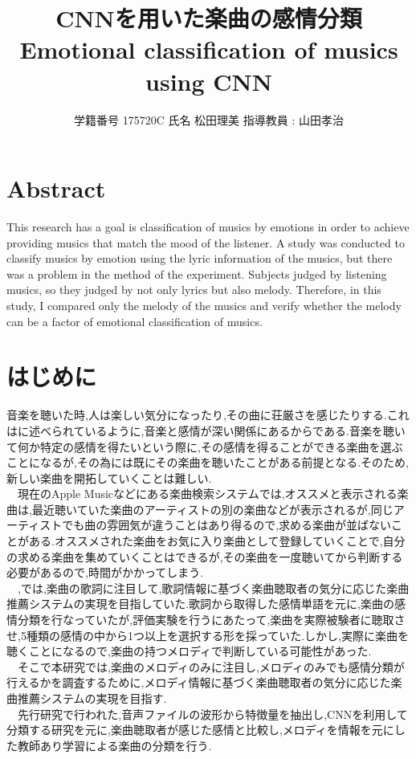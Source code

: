\documentclass[twocolumn,twoside,9.5pt]{jarticle}
\begin{document}
\title{CNNを用いた楽曲の感情分類\\Emotional classification of musics using CNN}
\author{学籍番号 {175720C} 氏名 {松田理美} 指導教員 : 山田孝治}
\date{}
\maketitle
\thispagestyle{fancy} 

\section*{Abstract}
This research has a goal is classification of musics by emotions in order to achieve providing musics that match the mood of the listener. A study was conducted to classify musics by emotion using the lyric information of the musics, but there was a problem in the method of the experiment.\cite{gushiken1}\cite{gushiken2} Subjects judged by listening musics, so they judged by not only lyrics but also melody. Therefore, in this study, I compared only the melody of the musics and verify whether the melody can be a factor of emotional classification of musics.

\section{はじめに}
音楽を聴いた時,人は楽しい気分になったり,その曲に荘厳さを感じたりする.これは\cite{ogushi}に述べられているように,音楽と感情が深い関係にあるからである.音楽を聴いて何か特定の感情を得たいという際に,その感情を得ることができる楽曲を選ぶことになるが,その為には既にその楽曲を聴いたことがある前提となる.そのため,新しい楽曲を開拓していくことは難しい.\\
　現在のApple Musicなどにある楽曲検索システムでは,オススメと表示される楽曲は,最近聴いていた楽曲のアーティストの別の楽曲などが表示されるが,同じアーティストでも曲の雰囲気が違うことはあり得るので,求める楽曲が並ばないことがある.オススメされた楽曲をお気に入り楽曲として登録していくことで,自分の求める楽曲を集めていくことはできるが,その楽曲を一度聴いてから判断する必要があるので,時間がかかってしまう.\\
　\cite{gushiken1},\cite{gushiken2}では,楽曲の歌詞に注目して,歌詞情報に基づく楽曲聴取者の気分に応じた楽曲推薦システムの実現を目指していた.歌詞から取得した感情単語を元に,楽曲の感情分類を行なっていたが,評価実験を行うにあたって,楽曲を実際被験者に聴取させ,5種類の感情の中から1つ以上を選択する形を採っていた.しかし,実際に楽曲を聴くことになるので,楽曲の持つメロディで判断している可能性があった.\\
　そこで本研究では,楽曲のメロディのみに注目し,メロディのみでも感情分類が行えるかを調査するために,メロディ情報に基づく楽曲聴取者の気分に応じた楽曲推薦システムの実現を目指す.\\
　先行研究で行われた,音声ファイルの波形から特徴量を抽出し,CNNを利用して分類する研究を元に,楽曲聴取者が感じた感情と比較し,メロディを情報を元にした教師あり学習による楽曲の分類を行う.
\end{document}
